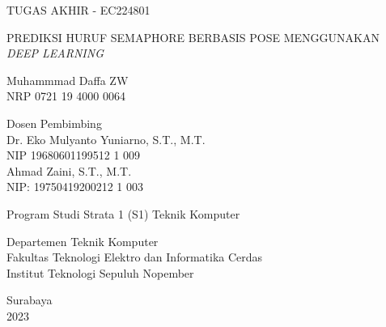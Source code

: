 \color{white}
\begin{large}
 TUGAS AKHIR - EC224801
\end{large}

\vspace{\fill}

\begin{spacing}{1.5}
  \begin{Large}
    PREDIKSI HURUF SEMAPHORE BERBASIS POSE MENGGUNAKAN \textit{DEEP LEARNING}%
  \end{Large}
\end{spacing}

\vspace{\fill}

\begin{large}
 Muhammmad Daffa ZW  \\
  \textmd{NRP 0721 19 4000 0064 }
\end{large}

\vspace{\fill}

\begin{large}
  \textmd{Dosen Pembimbing} \\
   Dr. Eko Mulyanto Yuniarno, S.T., M.T. \\
  \textmd{NIP 19680601199512 1 009} \\
   Ahmad Zaini, S.T., M.T. \\
  \textmd{NIP: 19750419200212 1 003 }
\end{large}

\vspace{\fill}

Program Studi Strata 1 (S1) Teknik Komputer \\

\mdseries

Departemen Teknik Komputer \\
Fakultas Teknologi Elektro dan Informatika Cerdas \\
Institut Teknologi Sepuluh Nopember

Surabaya \\
2023
